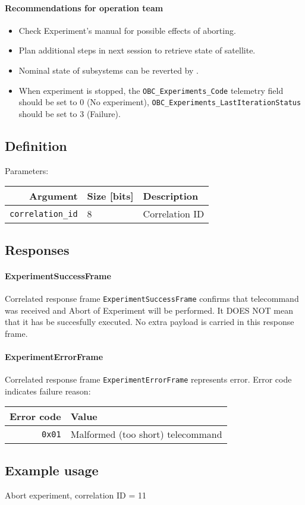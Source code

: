 \paragraph{Recommendations for operation team}
\begin{itemize}
	\item Check Experiment's manual for possible effects of aborting.
	\item Plan additional steps in next session to retrieve state of satellite.
	\item Nominal state of subsystems can be reverted by .
	\item When experiment is stopped, the \texttt{OBC_Experiments_Code} telemetry field should be set to 0 (No experiment), \texttt{OBC_Experiments_LastIterationStatus} should be set to 3 (Failure).
\end{itemize}

\subsection{Definition}

Parameters: 

\begin{tabular}{r | l | l}
	Argument                    & Size [bits] & Description \\
	\hline
	\texttt{correlation\_id}    & 8 		  &	Correlation ID \\
\end{tabular}

\subsection{Responses}

\paragraph{ExperimentSuccessFrame}
Correlated response frame \texttt{ExperimentSuccessFrame} confirms that telecommand was received and Abort of Experiment will be performed. It DOES NOT mean that it has be succesfully executed.
No extra payload is carried in this response frame.

\paragraph{ExperimentErrorFrame}
Correlated response frame \texttt{ExperimentErrorFrame} represents error. Error code indicates failure reason:

\begin{tabular}{r | l}
	Error code & Value \\
	\hline
	\texttt{0x01} & Malformed (too short) telecommand \\
	
\end{tabular}

\subsection{Example usage}
Abort experiment, correlation ID = 11
